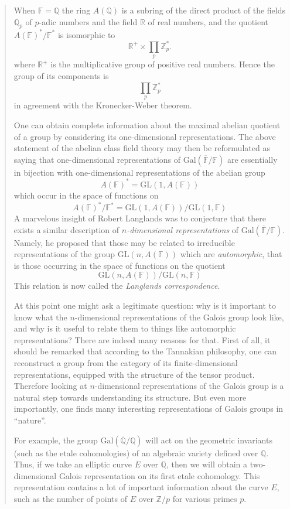 \documentclass{article}
\begin{document}
\begin{quote}
When \(\mathbb{F} = \mathbb{Q}\) the ring \(A(\mathbb{Q})\) is a subring
of the direct product of the fields \(\mathbb{Q}_p\) of \(p\)-adic
numbers and the field \(\mathbb{R}\) of real numbers, and the quotient
\(A(\mathbb{F})^*/\mathbb{F}^*\) is isomorphic to
\[\mathbb{R}^+ \times \prod_p \mathbb{Z}_p^*.\] where \(\mathbb{R}^+\)
is the multiplicative group of positive real numbers. Hence the group of
its components is \[\prod_p \mathbb{Z}_p^*\] in agreement with the
Kronecker-Weber theorem.

One can obtain complete information about the maximal abelian quotient
of a group by considering its one-dimensional representations. The above
statement of the abelian class field theory may then be reformulated as
saying that one-dimensional representations of
\(\mathrm{Gal}(\overline{\mathbb{F}}/\mathbb{F})\) are essentially in
bijection with one-dimensional representations of the abelian group
\[A(\mathbb{F})^* = \mathrm{GL}(1,A(\mathbb{F}))\] which occur in the
space of functions on
\[A(\mathbb{F})^*/\mathbb{F}^* = \mathrm{GL}(1,A(\mathbb{F}))/\mathrm{GL}(1,\mathbb{F})\]
A marvelous insight of Robert Langlands was to conjecture that there
exists a similar description of \emph{\(n\)-dimensional representations}
of \(\mathrm{Gal}(\overline{\mathbb{F}}/\mathbb{F})\). Namely, he
proposed that those may be related to irreducible representations of the
group \(\mathrm{GL}(n,A(\mathbb{F}))\) which are \emph{automorphic},
that is those occurring in the space of functions on the quotient
\[\mathrm{GL}(n,A(\mathbb{F}))/\mathrm{GL}(n,\mathbb{F})\] This relation
is now called the \emph{Langlands correspondence}.

At this point one might ask a legitimate question: why is it important
to know what the \(n\)-dimensional representations of the Galois group
look like, and why is it useful to relate them to things like
automorphic representations? There are indeed many reasons for that.
First of all, it should be remarked that according to the Tannakian
philosophy, one can reconstruct a group from the category of its
finite-dimensional representations, equipped with the structure of the
tensor product. Therefore looking at \(n\)-dimensional representations
of the Galois group is a natural step towards understanding its
structure. But even more importantly, one finds many interesting
representations of Galois groups in ``nature''.

For example, the group
\(\mathrm{Gal}(\overline{\mathbb{Q}}/\mathbb{Q})\) will act on the
geometric invariants (such as the etale cohomologies) of an algebraic
variety defined over \(\mathbb{Q}\). Thus, if we take an elliptic curve
\(E\) over \(\mathbb{Q}\), then we will obtain a two-dimensional Galois
representation on its first etale cohomology. This representation
contains a lot of important information about the curve \(E\), such as
the number of points of \(E\) over \(\mathbb{Z}/p\) for various primes
\(p\).


\end{quote}
\end{document}
